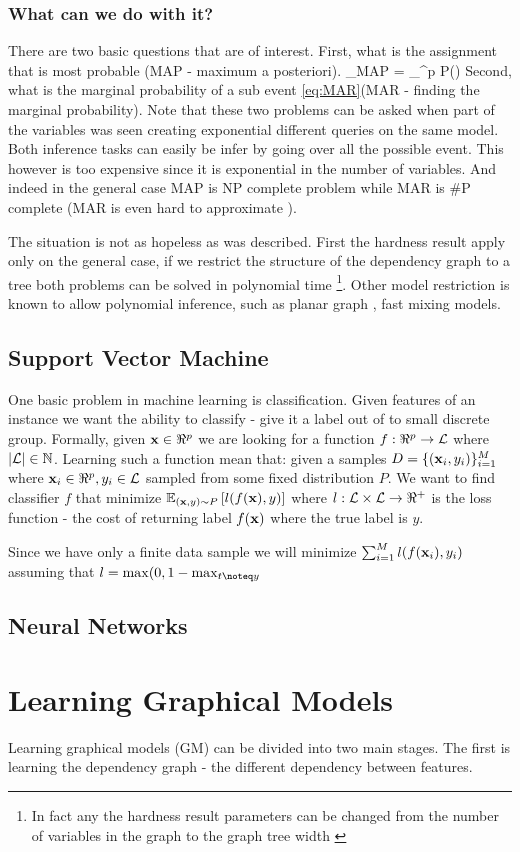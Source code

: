 \subsubsection{What can we do with it?}
There are two basic questions that are of interest.
First, what is the assignment that is most probable (MAP - maximum a posteriori).
\be
\label{eq:MAP}
\xx_{MAP} = \arg \max_{\xx \in \cX^p} P(\xx) 
\ee
Second, what is the marginal probability of a sub event \eqref{eq:MAR}(MAR - finding the marginal probability).
Note that these two problems can be asked when part of the variables was seen creating exponential different queries on the same model. 
Both inference tasks can easily be infer by going over all the possible event.
This however is too expensive since it is exponential in the number of variables.
And indeed in the general case MAP\cite{shimony1994finding} is NP complete problem while MAR\cite{cooper1990computational} is \#P complete (MAR is even hard to approximate \cite{roth1996hardness}).

The situation is not as hopeless as was described.
First the hardness result apply only on the general case, if we restrict the structure of the dependency graph to a tree both problems can be solved in polynomial time \footnote{In fact any the hardness result parameters can be changed from the number of variables in the graph to the graph tree width \cite{robertson1983graph,robertson1994quickly} }.
Other model restriction is known to allow polynomial inference, such as planar graph \cite{jaakkola2007approximate}, fast mixing models\cite{jerrum1993polynomial}.
\subsection{Support Vector Machine}
One basic problem in machine learning is classification.
Given features of an instance we want the ability to classify - give it a label out of to small discrete group.
Formally, given ${\bf x} \in \Re^p$ we are looking for a function $f: \Re^p \to {\cal L}$ where $|{\cal L}|\in \mathbb{N}$.
Learning such a function mean that: given a samples $D = \{({\bf x}_i,y_i)\}_{i=1}^M$  where ${\bf x}_i \in \Re^p, y_i \in {\cal L}$ sampled from some fixed distribution $P$.
We want to find classifier $f$ that minimize $\mathbb{E}_{({\bf x},y) \sim P}\left[{l(f({\bf x}),y)}\right]$ where $l : {\cal L} \times {\cal L} \to \Re^{+}$ is the loss function - the cost of returning label $f({\bf x})$ where the true label is $y$.

Since we have only a finite data sample we will minimize $\sum_{i=1}^M l(f({\bf x}_i),y_i)$ 
assuming that $l=\max(0,1-\max_{t \noteq y}$




\subsection{Neural Networks}
\section{Learning Graphical Models}
Learning graphical models (GM) can be divided into two main stages.
The first is learning the dependency graph - the different dependency between features.
